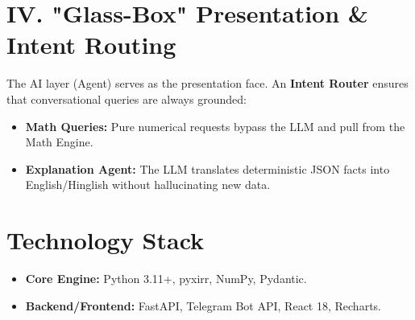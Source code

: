 \documentclass[11pt,a4paper]{article}
\begin{document}
\section{IV. "Glass-Box" Presentation \& Intent Routing}
The AI layer (Agent) serves as the presentation face. An \textbf{Intent Router} ensures that conversational queries are always grounded:
\begin{itemize}[nosep]
    \item \textbf{Math Queries:} Pure numerical requests bypass the LLM and pull from the Math Engine.
    \item \textbf{Explanation Agent:} The LLM translates deterministic JSON facts into English/Hinglish without hallucinating new data.
\end{itemize}

\section{Technology Stack}
\begin{itemize}[nosep]
    \item \textbf{Core Engine:} Python 3.11+, pyxirr, NumPy, Pydantic.
    \item \textbf{Backend/Frontend:} FastAPI, Telegram Bot API, React 18, Recharts.
\end{itemize}
\end{document}
